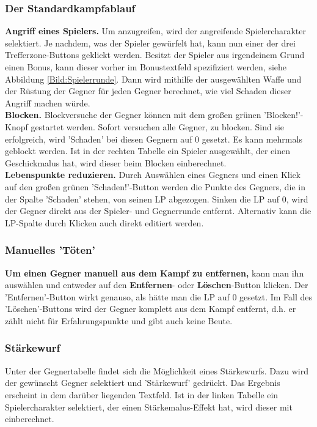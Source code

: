 \documentclass[11pt, a4paper, german]{article}
\begin{document}
\subsubsection{Der Standardkampfablauf}\label{Abschnitt:standardkampf}
\textbf{Angriff eines Spielers.} Um anzugreifen, wird der angreifende Spielercharakter selektiert. Je nachdem, was der Spieler gewürfelt hat, kann nun einer der drei Trefferzone-Buttons geklickt werden. Besitzt der Spieler aus irgendeinem Grund einen Bonus, kann dieser vorher im Bonustextfeld spezifiziert werden, siehe Abbildung \ref{Bild:Spielerrunde}. Dann wird mithilfe der ausgewählten Waffe und der Rüstung der Gegner für jeden Gegner berechnet, wie viel Schaden dieser Angriff machen würde.\\

\textbf{Blocken.} Blockversuche der Gegner können mit dem großen grünen 'Blocken!'-Knopf gestartet werden. Sofort versuchen alle Gegner, zu blocken. Sind sie erfolgreich, wird 'Schaden' bei diesen Gegnern auf 0 gesetzt. Es kann mehrmals geblockt werden. Ist in der rechten Tabelle ein Spieler ausgewählt, der einen Geschickmalus hat, wird dieser beim Blocken einberechnet.\\

\textbf{Lebenspunkte reduzieren.} Durch Auswählen eines Gegners und einen Klick auf den großen grünen 'Schaden!'-Button werden die Punkte des Gegners, die in der Spalte 'Schaden' stehen, von seinen LP abgezogen. Sinken die LP auf 0, wird der Gegner direkt aus der Spieler- und Gegnerrunde entfernt. Alternativ kann die LP-Spalte durch Klicken auch direkt editiert werden.

\subsubsection{Manuelles 'Töten'}

\textbf{Um einen Gegner manuell aus dem Kampf zu entfernen,} kann man ihn auswählen und entweder auf den \textbf{Entfernen}- oder \textbf{Löschen}-Button klicken. Der 'Entfernen'-Button wirkt genauso, als hätte man die LP auf 0 gesetzt. Im Fall des 'Löschen'-Buttons wird der Gegner komplett aus dem Kampf entfernt, d.h. er zählt nicht für Erfahrungspunkte und gibt auch keine Beute.

\subsubsection{Stärkewurf}\label{Abschnitt:staerkewurf}
Unter der Gegnertabelle findet sich die Möglichkeit eines Stärkewurfs. Dazu wird der gewünscht Gegner selektiert und 'Stärkewurf' gedrückt. Das Ergebnis erscheint in dem darüber liegenden Textfeld. Ist in der linken Tabelle ein Spielercharakter selektiert, der einen Stärkemalus-Effekt hat, wird dieser mit einberechnet.
\end{document}
